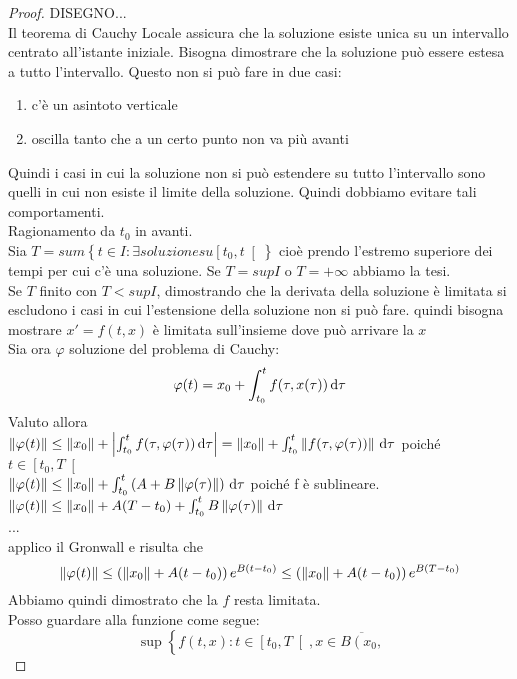 \begin{proof}
	DISEGNO...\\
	Il teorema di Cauchy Locale assicura che  la soluzione esiste unica su un intervallo centrato all'istante iniziale.
	Bisogna dimostrare che la soluzione può essere estesa a tutto l'intervallo. Questo non si può fare in due casi:
	\begin{enumerate}
		\item c'è un asintoto verticale
		\item oscilla tanto che a un certo punto non va più avanti
	\end{enumerate}
	Quindi i casi in cui la soluzione non si può estendere su tutto l'intervallo sono quelli in cui non esiste il limite della soluzione. Quindi dobbiamo evitare tali comportamenti.\\
	Ragionamento da $t_0$ in avanti.\\
	Sia $T=sum\left\{t\in I :\exists soluzione su \left[ t_0,t \right[ \right\}$ cioè prendo l'estremo superiore dei tempi per cui c'è una soluzione.
	Se $T= sup I$ o $T=+\infty$ abbiamo la tesi.\\
	Se $T$ finito con $T<sup I$, dimostrando che la derivata della soluzione è limitata si escludono i casi in cui l'estensione della soluzione non si può fare.
	quindi bisogna mostrare $ x' = f(t,x)$ è limitata sull'insieme dove può arrivare la $x$\\
	Sia ora $\varphi$ soluzione del problema di Cauchy:
	$$ \varphi(t) = x_0 + \int_{t_0}^tf(\tau,x(\tau))\,\mathrm{d}{\tau}$$
	Valuto allora\\
	$\left\|\varphi(t)\right\|\le \left\|x_0\right\| + \left|\int_{t_0}^tf(\tau,\varphi(\tau))\,\mathrm{d}{\tau}\right|=\left\|x_0\right\| + \int_{t_0}^t\left\|f(\tau,\varphi(\tau))\right\|\,\mathrm{d}{\tau}$ poiché $t\in\left[t_0,T\right[$\\
	$\left\|\varphi(t)\right\|\le \left\|x_0\right\| + \int_{t_0}^t\left(A+B\left\|\varphi(\tau)\right\|\right)\,\mathrm{d}{\tau}$ poiché f è sublineare.\\
	$\left\|\varphi(t)\right\|\le \left\|x_0\right\| + A(T-t_0)+\int_{t_0}^t B\left\|\varphi(\tau)\right\|\,\mathrm{d}{\tau}$\\
	...\\
	applico il Gronwall e risulta che
	$$\left\|\varphi(t)\right\|\le\left(\left\|x_0\right\|+A(t-t_0)\right)e^{B(t-t_0)}\le\left(\left\|x_0\right\|+A(t-t_0)\right)e^{B(T-t_0)}$$	
	Abbiamo quindi dimostrato che la $f$ resta limitata.\\
	Posso guardare alla funzione come segue:\\
	$$
	\sup
	\left\{f(t,x): t\in\left[t_0,T\right[, x\in \overline{B\left(x_0,
}$$
\end{proof}
